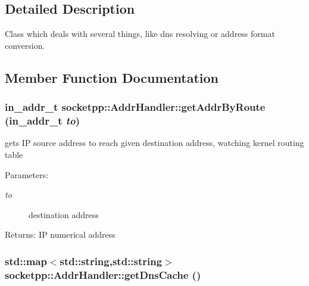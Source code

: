 \subsection{Detailed Description}
Class which deals with several things, like dns resolving or address format conversion. 

\subsection{Member Function Documentation}
\hypertarget{classsocketpp_1_1AddrHandler_79db1454cc9c12bbd44b526f61ff84fb}{
\subsubsection[{getAddrByRoute}]{\setlength{\rightskip}{0pt plus 5cm}in\_\-addr\_\-t socketpp::AddrHandler::getAddrByRoute (in\_\-addr\_\-t {\em to})}}
\label{classsocketpp_1_1AddrHandler_79db1454cc9c12bbd44b526f61ff84fb}


gets IP source address to reach given destination address, watching kernel routing table 

\begin{Desc}
\item[Parameters:]
\begin{description}
\item[{\em to}]destination address \end{description}
\end{Desc}
\begin{Desc}
\item[Returns:]IP numerical address \end{Desc}
\hypertarget{classsocketpp_1_1AddrHandler_4e10f2291b27d7db2a2860502721f960}{
\subsubsection[{getDnsCache}]{\setlength{\rightskip}{0pt plus 5cm}std::map$<$std::string,std::string$>$ socketpp::AddrHandler::getDnsCache ()}}
\label{classsocketpp_1_1AddrHandler_4e10f2291b27d7db2a2860502721f960}


